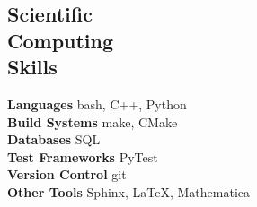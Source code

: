 \documentclass[margin,line]{resume}
\begin{document}
\begin{resume}
    \section{\mysidestyle Scientific\\Computing\\Skills}
                \textbf{Languages} \hfill bash, C++, Python\vspace{.5mm}\\%
                \textbf{Build Systems} \hfill make, CMake\vspace{.5mm}\\%
                \textbf{Databases} \hfill SQL\vspace{.5mm}\\%
                \textbf{Test Frameworks} \hfill PyTest\vspace{.5mm}\\%
                \textbf{Version Control} \hfill git\vspace{.5mm}\\%
                \textbf{Other Tools} \hfill Sphinx, \LaTeX, Mathematica\vspace{.5mm}%




\end{resume}
\end{document}
